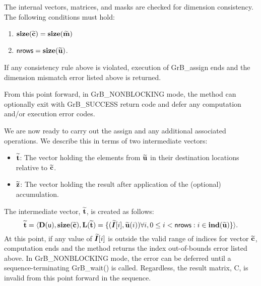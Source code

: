 The internal vectors, matrices, and masks are checked for dimension consistency. 
The following conditions must hold:
\begin{enumerate}
	\item $\bold{size}({\bf \widetilde{c}}) = \bold{size}({\bf \widetilde{m}})$
    \item ${\sf nrows} = \bold{size}({\bf \widetilde{u}})$.
\end{enumerate}
If any consistency rule above is violated, execution of {\sf GrB\_assign} ends and 
the dimension mismatch error listed above is returned.

From this point forward, in {\sf GrB\_NONBLOCKING} mode, the method can 
optionally exit with {\sf GrB\_SUCCESS} return code and defer any computation 
and/or execution error codes.

We are now ready to carry out the assign and any additional 
associated operations.  We describe this in terms of two intermediate vectors:
\begin{itemize}
    \item ${\bf \widetilde{t}}$: The vector holding the elements from
    ${\bf \widetilde{u}}$ in their destination locations relative to 
    ${\bf \widetilde{c}}$.
    
    \item ${\bf \widetilde{z}}$: The vector holding the result after 
    application of the (optional) accumulation.
\end{itemize}

The intermediate vector, ${\bf \widetilde{t}}$, is created as follows:
\[
{\bf \widetilde{t}} = \langle
\bold{D}({\sf u}), \bold{size}({\bf \widetilde{c}}),
\bold{L}({\bf \widetilde{t}}) =
\{(\bm{\widetilde{I}}[i],{\bf \widetilde{u}}(i)) \forall i, 0 \leq i < {\sf nrows} : 
i \in \bold{ind}({\bf \widetilde{u}}) \} \rangle. 
\]
At this point, if any value of $\bm{\widetilde{I}}[i]$ is outside the valid 
range of indices for vector ${\bf \widetilde{c}}$, computation ends and the 
method returns the index out-of-bounds error listed above. In 
{\sf GrB\_NONBLOCKING} mode, the error can be deferred until a 
sequence-terminating {\sf GrB\_wait()} is called.  Regardless, the result 
matrix, {\sf C}, is invalid from this point forward in the 
sequence.


